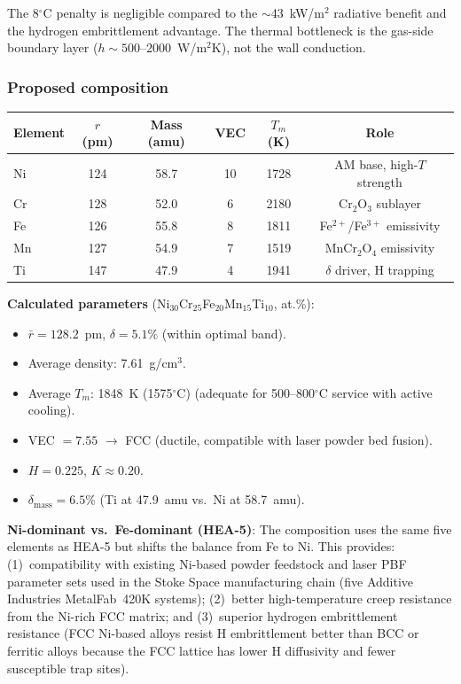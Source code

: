 \documentclass[12pt,letterpaper]{article}
\theoremstyle{definition}
\begin{document}
The 8$^\circ$C penalty is negligible compared to the $\sim$43~kW/m$^2$ radiative benefit and the hydrogen embrittlement advantage.  The thermal bottleneck is the gas-side boundary layer ($h \sim 500$--$2000$~W/m$^2$K), not the wall conduction.

\subsubsection{Proposed composition}

\begin{center}
\begin{tabular}{@{}lccccc@{}}
\toprule
Element & $r$ (pm) & Mass (amu) & VEC & $T_m$ (K) & Role \\
\midrule
Ni & 124 & 58.7 & 10 & 1728 & AM base, high-$T$ strength \\
Cr & 128 & 52.0 & 6 & 2180 & Cr$_2$O$_3$ sublayer \\
Fe & 126 & 55.8 & 8 & 1811 & Fe$^{2+}$/Fe$^{3+}$ emissivity \\
Mn & 127 & 54.9 & 7 & 1519 & MnCr$_2$O$_4$ emissivity \\
Ti & 147 & 47.9 & 4 & 1941 & $\delta$ driver, H trapping \\
\bottomrule
\end{tabular}
\end{center}

\textbf{Calculated parameters} (Ni$_{30}$Cr$_{25}$Fe$_{20}$Mn$_{15}$Ti$_{10}$, at.\%):
\begin{itemize}
  \item $\bar{r} = 128.2$~pm, \quad $\delta = 5.1\%$ \quad (within optimal band).
  \item Average density: 7.61~g/cm$^3$.
  \item Average $T_m$: 1848~K (1575$^\circ$C) \quad (adequate for 500--800$^\circ$C service with active cooling).
  \item VEC $= 7.55$ $\to$ FCC \quad (ductile, compatible with laser powder bed fusion).
  \item $H = 0.225$, \quad $K \approx 0.20$.
  \item $\delta_{\mathrm{mass}} = 6.5\%$ \quad (Ti at 47.9~amu vs.\ Ni at 58.7~amu).
\end{itemize}

\textbf{Ni-dominant vs.\ Fe-dominant (HEA-5)}: The composition uses the same five elements as HEA-5 but shifts the balance from Fe to Ni.  This provides: (1)~compatibility with existing Ni-based powder feedstock and laser PBF parameter sets used in the Stoke Space manufacturing chain (five Additive Industries MetalFab~420K systems); (2)~better high-temperature creep resistance from the Ni-rich FCC matrix; and (3)~superior hydrogen embrittlement resistance (FCC Ni-based alloys resist H embrittlement better than BCC or ferritic alloys because the FCC lattice has lower H diffusivity and fewer susceptible trap sites).
\end{document}
